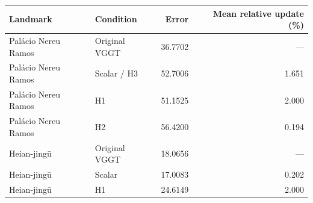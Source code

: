\begin{tabular}{llrr}
\toprule
Landmark & Condition & Error & Mean relative update (\%)\\
\midrule
Pal\'acio Nereu Ramos & Original VGGT & 36.7702 & ---\\
Pal\'acio Nereu Ramos & Scalar / H3 & 52.7006 & 1.651\\
Pal\'acio Nereu Ramos & H1 & 51.1525 & 2.000\\
Pal\'acio Nereu Ramos & H2 & 56.4200 & 0.194\\
\midrule
Heian-jing\={u} & Original VGGT & 18.0656 & ---\\
Heian-jing\={u} & Scalar & 17.0083 & 0.202\\
Heian-jing\={u} & H1 & 24.6149 & 2.000\\
\bottomrule
\end{tabular}

